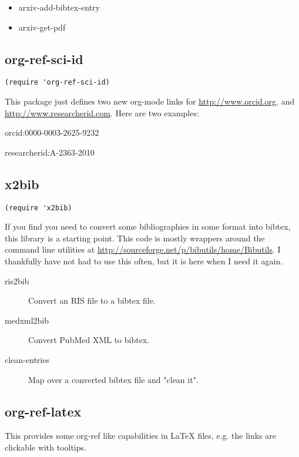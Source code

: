 \documentclass[11pt]{article}
\begin{document}
{\begin{itemize}
\item arxiv-add-bibtex-entry
\item arxiv-get-pdf
\end{itemize}

\subsection{org-ref-sci-id}
\label{sec:orgheadline25}
 

\begin{verbatim}
(require 'org-ref-sci-id)
\end{verbatim}

This package just defines two new org-mode links for \url{http://www.orcid.org}, and \url{http://www.researcherid.com}. Here are two examples:

orcid:0000-0003-2625-9232

researcherid:A-2363-2010

\subsection{x2bib}
\label{sec:orgheadline26}

\begin{verbatim}
(require 'x2bib)
\end{verbatim}

If you find you need to convert some bibliographies in some format into bibtex, this library is a starting point. This code is mostly wrappers around the command line utilities at \url{http://sourceforge.net/p/bibutils/home/Bibutils}. I thankfully have not had to use this often, but it is here when I need it again.

\begin{description}
\item[{ris2bib}] Convert an RIS file to a bibtex file.
\item[{medxml2bib}] Convert PubMed XML to bibtex.
\item[{clean-entries}] Map over a converted bibtex file and "clean it".
\end{description}

\subsection{org-ref-latex}
\label{sec:orgheadline27}
This provides some org-ref like capabilities in \LaTeX{} files, e.g. the links are clickable with tooltips.

}
\end{document}
